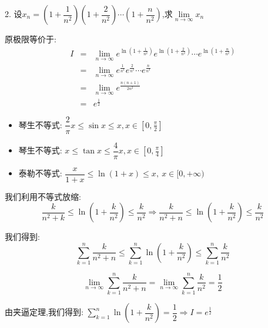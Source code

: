 2. 设$x_{n}=(1+\dfrac{1}{n^2})(1+\dfrac{2}{n^2})\cdots(1+\dfrac{n}{n^2})$,求$\lim\limits_{n\rightarrow\infty}x_{n}$
\begin{solution}
	
	原极限等价于: 
	\begin{eqnarray*}
		I&=&\lim\limits_{n\rightarrow\infty}e^{\ln(1+\frac{1}{n^2})}e^{\ln(1+\frac{2}{n^2})}\cdots e^{\ln(1+\frac{n}{n^2})}\\
		&=&\lim\limits_{n\rightarrow\infty}e^{\frac{1}{n^2}}e^{\frac{2}{n^2}}\cdots e^{\frac{n}{n^2}}\\
		&=&\lim\limits_{n\rightarrow\infty}e^{\frac{n(n+1)}{2n^2}}\\
		&=&e^{\frac{1}{2}}
	\end{eqnarray*}
	\begin{lemma}[不等式放缩]
		\begin{itemize}
			\item $\text{琴生不等式: }\dfrac{2}{\pi}x\leq \sin x\leq x,x\in[0,\frac{\pi}{2}]$
			\item $\text{琴生不等式: }x\leq \tan x\leq \dfrac{4}{\pi}x,x\in[0,\frac{\pi}{4}]$
			\item $\text{泰勒不等式: }\dfrac{x}{1+x}\leq \ln(1+x)\leq x,\ x\in[0,+\infty)$
		\end{itemize}
	\end{lemma}
	我们利用不等式放缩: 
	$$\frac{k}{n^2+k}\leq \ln(1+\frac{k}{n^2})\leq \frac{k}{n^2}\Rightarrow \frac{k}{n^2+n}\leq \ln(1+\frac{k}{n^2})\leq \frac{k}{n^2}$$
	
	我们得到: 
	$$\sum\limits_{k=1}^{n}\frac{k}{n^2+n}\leq \sum\limits_{k=1}^{n}\ln(1+\frac{k}{n^2})\leq \sum\limits_{k=1}^{n}\frac{k}{n^2}$$
	
	$$\lim\limits_{n\rightarrow\infty}\sum\limits_{k=1}^{n}\frac{k}{n^2+n}=\lim\limits_{n\rightarrow\infty}\sum\limits_{k=1}^{n}\dfrac{k}{n^2}=\dfrac{1}{2}$$
	
	由夹逼定理,我们得到: $\sum\limits_{k=1}^{n}\ln(1+\dfrac{k}{n^2})=\dfrac{1}{2}\Rightarrow I=e^{\frac{1}{2}}$
\end{solution}


